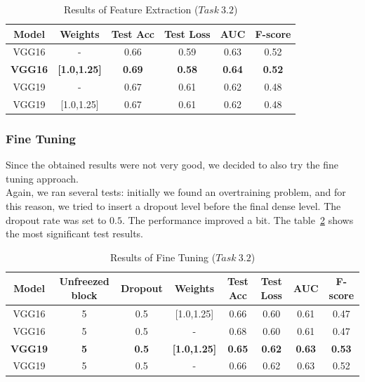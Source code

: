 \documentclass[11pt,a4paper,oneside]{article}
\begin{document}
\begin{table}[h]
\centering
\begin{tabular}{|cc|cccc|}
\hline
Model & Weights & Test Acc & Test Loss & AUC & F-score \\
\hline
VGG16 & -		   & 0.66 & 0.59 & 0.63 & 0.52 \\
\textbf{VGG16} & \textbf{[1.0,1.25]} & \textbf{0.69} & \textbf{0.58} & \textbf{0.64} & \textbf{0.52} \\
VGG19 & - 		   & 0.67 & 0.61 & 0.62 & 0.48 \\
VGG19 & [1.0,1.25] & 0.67 & 0.61 & 0.62 & 0.48 \\
\hline
\end{tabular}
\caption{Results of Feature Extraction ($Task\ 3.2$)}
\label{tab:task3.2_fe}
\end{table}


\subsubsection{Fine Tuning}
Since the obtained results were not very good, we decided to also try the fine tuning approach. \\
Again, we ran several tests: initially we found an overtraining problem, and for this reason, we tried to insert a dropout level before the final dense level. The dropout rate was set to $0.5$. The performance improved a bit. The table~\ref{tab:task3.2_ft} shows the most significant test results. \\

\begin{table}[h]
\centering
\begin{tabular}{|cccc|cccc|}
\hline
Model & Unfreezed block & Dropout & Weights & Test Acc & Test Loss & AUC & F-score \\
\hline
VGG16 & 5 & 0.5 & [1.0,1.25] & 0.66 & 0.60 & 0.61 & 0.47 \\
VGG16 & 5 & 0.5 & - 	     & 0.68 & 0.60 & 0.61 & 0.47 \\
\textbf{VGG19} & \textbf{5} & \textbf{0.5} & \textbf{[1.0,1.25]} & \textbf{0.65} & \textbf{0.62} & \textbf{0.63} & \textbf{0.53} \\
VGG19 & 5 & 0.5 & -	   	     & 0.66 & 0.62 & 0.63 & 0.52 \\
\hline
\end{tabular}
\caption{Results of Fine Tuning ($Task\ 3.2$)}
\label{tab:task3.2_ft}
\end{table}

\clearpage
\end{document}
